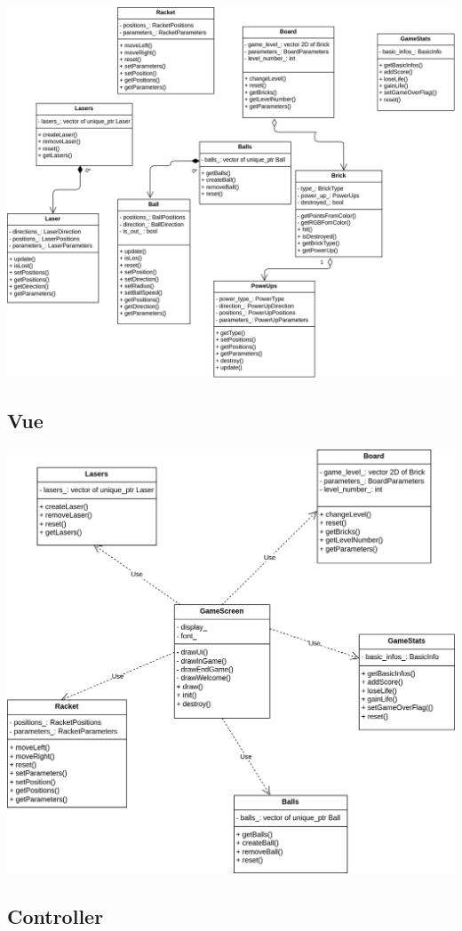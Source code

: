 \documentclass{article}
\begin{document}
\includegraphics[width=\textwidth]{model.png}


\subsection{Vue}

\includegraphics[width=\textwidth]{view.png}


\subsection{Controller}
\end{document}
